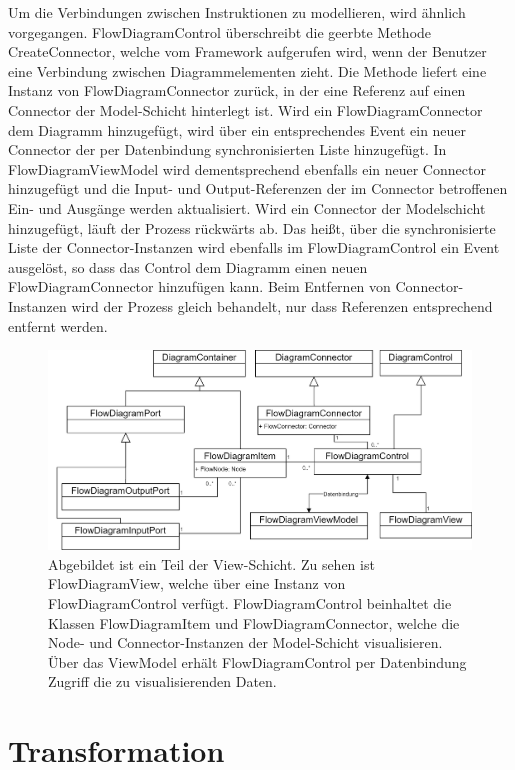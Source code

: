 \newline
Um die Verbindungen zwischen Instruktionen zu modellieren, wird ähnlich vorgegangen. FlowDiagramControl überschreibt die geerbte Methode CreateConnector, welche vom Framework aufgerufen wird, wenn der Benutzer eine Verbindung zwischen Diagrammelementen zieht. Die Methode liefert eine Instanz von FlowDiagramConnector zurück, in der eine Referenz auf einen Connector der Model-Schicht hinterlegt ist. Wird ein FlowDiagramConnector dem Diagramm hinzugefügt, wird über ein entsprechendes Event ein neuer Connector der per Datenbindung synchronisierten Liste hinzugefügt. In FlowDiagramViewModel wird dementsprechend ebenfalls ein neuer Connector hinzugefügt und die Input- und Output-Referenzen der im Connector betroffenen Ein- und Ausgänge werden aktualisiert. Wird ein Connector der Modelschicht hinzugefügt, läuft der Prozess rückwärts ab. Das heißt, über die synchronisierte Liste der Connector-Instanzen wird ebenfalls im FlowDiagramControl ein Event ausgelöst, so dass das Control dem Diagramm einen neuen FlowDiagramConnector hinzufügen kann. Beim Entfernen von Connector-Instanzen wird der Prozess gleich behandelt, nur dass Referenzen entsprechend entfernt werden.      

\begin{figure} %
	\centering
		\includegraphics[width=\textwidth]{img/FlowViewUML.png}
	\caption[Klassenstruktur der View-Schicht]{Abgebildet ist ein Teil der View-Schicht. Zu sehen ist FlowDiagramView, welche über eine Instanz von FlowDiagramControl verfügt. FlowDiagramControl beinhaltet die Klassen FlowDiagramItem und FlowDiagramConnector, welche die Node- und Connector-Instanzen der Model-Schicht visualisieren. Über das ViewModel erhält FlowDiagramControl per Datenbindung Zugriff die zu visualisierenden Daten.}
	\label{fig:UML:FlowView}
\end{figure}


\section{Transformation}
\label{sec:Transformation}

